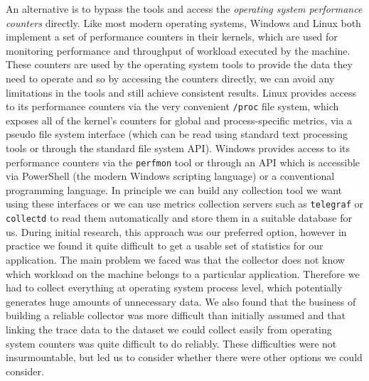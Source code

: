 An alternative is to bypass the tools and access the \emph{operating system performance counters} directly.  Like most modern operating systems, Windows and Linux both implement a set of performance counters in their kernels, which are used for monitoring performance and throughput of workload executed by the machine.  These counters are used by the operating system tools to provide the data they need to operate and so by accessing the counters directly, we can avoid any limitations in the tools and still achieve consistent results.  Linux provides access to its performance counters via the very convenient \texttt{{/proc}} file system, which exposes all of the kernel's counters for global and process-specific metrics, via a pseudo file system interface (which can be read using standard text processing tools or through the standard file system API).  Windows provides access to its performance counters via the \texttt{perfmon} tool or through an API which is accessible via PowerShell (the modern Windows scripting language) or a conventional programming language.  In principle we can build any collection tool we want using these interfaces or we can use metrics collection servers such as \texttt{telegraf} or \texttt{collectd} \cite{telegraf2018, collectd2018} to read them automatically and store them in a suitable database for us.  During initial research, this approach was our preferred option, however in practice we found it quite difficult to get a usable set of statistics for our application.  The main problem we faced was that the collector does not know which workload on the machine belongs to a particular application.  Therefore we had to collect everything at operating system process level, which potentially generates huge amounts of unnecessary data.  We also found that the business of building a reliable collector was more difficult than initially assumed and that linking the trace data to the dataset we could collect easily from operating system counters was quite difficult to do reliably.  These difficulties were not insurmountable, but led us to consider whether there were other options we could consider.

